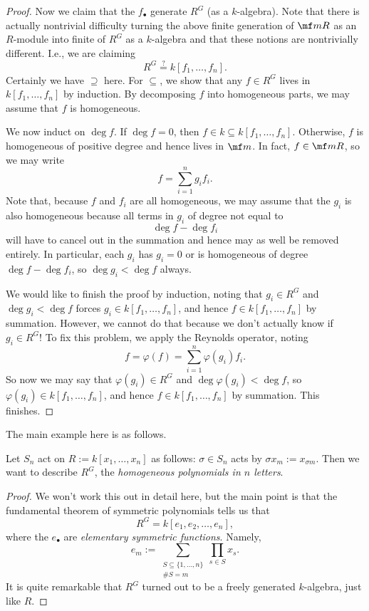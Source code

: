 \begin{proof}
	Now we claim that the $f_\bullet$ generate $R^G$ (as a $k$-algebra). Note that there is actually nontrivial difficulty turning the above finite generation of $\mf mR$ as an $R$-module into finite of $R^G$ as a $k$-algebra and that these notions are nontrivially different. I.e., we are claiming
	\[R^G\stackrel?=k[f_1,\ldots,f_n].\]
	Certainly we have $\supseteq$ here. For $\subseteq$, we show that any $f\in R^G$ lives in $k[f_1,\ldots,f_n]$ by induction. By decomposing $f$ into homogeneous parts, we may assume that $f$ is homogeneous.

	We now induct on $\deg f$. If $\deg f=0$, then $f\in k\subseteq k[f_1,\ldots,f_n]$. Otherwise, $f$ is homogeneous of positive degree and hence lives in $\mf m$. In fact, $f\in\mf mR$, so we may write
	\[f=\sum_{i=1}^ng_if_i.\]
	Note that, because $f$ and $f_i$ are all homogeneous, we may assume that the $g_i$ is also homogeneous because all terms in $g_i$ of degree not equal to
	\[\deg f-\deg f_i\]
	will have to cancel out in the summation and hence may as well be removed entirely. In particular, each $g_i$ has $g_i=0$ or is homogeneous of degree $\deg f-\deg f_i$, so $\deg g_i<\deg f$ always.

	We would like to finish the proof by induction, noting that $g_i\in R^G$ and $\deg g_i<\deg f$ forces $g_i\in k[f_1,\ldots,f_n]$, and hence $f\in k[f_1,\ldots,f_n]$ by summation. However, we cannot do that because we don't actually know if $g_i\in R^G$! To fix this problem, we apply the Reynolds operator, noting
	\[f=\varphi(f)=\sum_{i=1}^n\varphi(g_i)f_i.\]
	So now we may say that $\varphi(g_i)\in R^G$ and $\deg\varphi(g_i)<\deg f$, so $\varphi(g_i)\in k[f_1,\ldots,f_n]$, and hence $f\in k[f_1,\ldots,f_n]$ by summation. This finishes.
\end{proof}
The main example here is as follows.
\begin{exe}
	Let $S_n$ act on $R:=k[x_1,\ldots,x_n]$ as follows: $\sigma\in S_n$ acts by $\sigma x_m:=x_{\sigma m}$. Then we want to describe $R^G$, the \textit{homogeneous polynomials in $n$ letters}.
\end{exe}
\begin{proof}
	We won't work this out in detail here, but the main point is that the fundamental theorem of symmetric polynomials tells us that
	\[R^G=k[e_1,e_2,\ldots,e_n],\]
	where the $e_\bullet$ are \textit{elementary symmetric functions}. Namely,
	\[e_m:=\sum_{\substack{S\subseteq\{1,\ldots,n\}\\\#S=m}}\prod_{s\in S}x_s.\]
	It is quite remarkable that $R^G$ turned out to be a freely generated $k$-algebra, just like $R$.
\end{proof}

